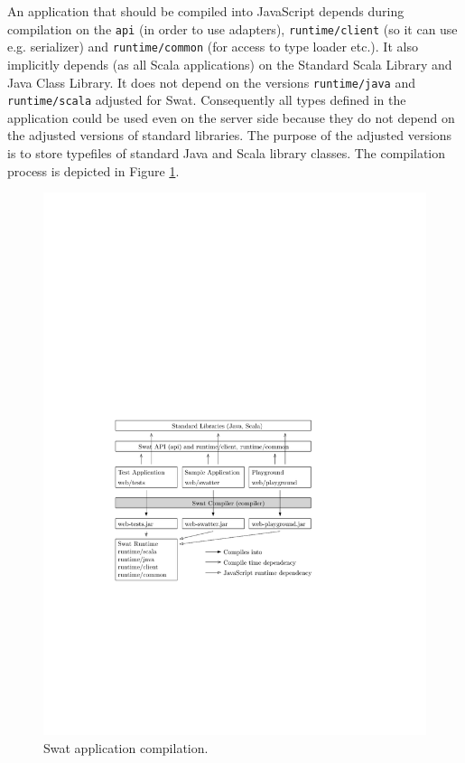\documentclass[12pt,a4paper]{report}
\begin{document}
An application that should be compiled into JavaScript depends during compilation on the \texttt{api} (in order to use adapters), \texttt{runtime/client} (so it can use e.g. serializer) and \texttt{runtime/common} (for access to type loader etc.). It also implicitly depends (as all Scala applications) on the Standard Scala Library and Java Class Library. It does not depend on the versions \texttt{runtime/java} and \texttt{runtime/scala} adjusted for Swat. Consequently all types defined in the application could be used even on the server side because they do not depend on the adjusted versions of standard libraries. The purpose of the adjusted versions is to store typefiles of standard Java and Scala library classes. The compilation process is depicted in Figure \ref{AppCompilation}.

\begin{figure}[ht]
  \centering
	\includegraphics[width=\linewidth,height=\textheight,keepaspectratio]{img/AppCompilation.pdf}
	\caption{Swat application compilation.}
	\label{AppCompilation}
\end{figure}
\end{document}
